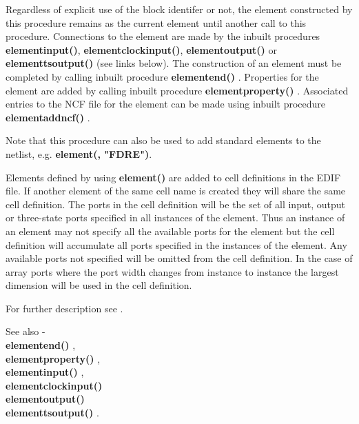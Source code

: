         Regardless of explicit use of the block identifer or not, the element
        constructed by this procedure remains as the current element until
        another call to this procedure. Connections to the element are made by
        the inbuilt procedures {\bf elementinput()}, {\bf elementclockinput()},
        {\bf elementoutput()} or {\bf elementtsoutput()} (see links below). The
        construction of an element must be completed by calling inbuilt
        procedure {\bf elementend()} . Properties
        for the element are added by calling inbuilt procedure {\bf
        elementproperty()} . Associated entries
        to the NCF file for the element can be made using inbuilt
        procedure {\bf elementaddncf()} .
        
        Note that this procedure can also be used to add standard elements to
        the netlist, e.g. {\bf element(, "FDRE")}.
        
        Elements defined by using {\bf element()} are added to cell definitions in
        the EDIF file. If another element of the same cell name is created they
        will share the same cell definition. The ports in the cell definition will
        be the set of all input, output or three-state ports specified in all
        instances of the element. Thus an instance of an element may not specify
        all the available ports for the element but the cell definition will
        accumulate all ports specified in the instances of the element. Any
        available ports not specified will be omitted from the cell definition.
        In the case of array ports where the port width
        changes from instance to instance the largest dimension will be used in
        the cell definition.
        
        For further description see .

        See also - \\
        {\bf elementend()} , \\
        {\bf elementproperty()} , \\
        {\bf elementinput()} , \\
        {\bf elementclockinput()}  \\
        {\bf elementoutput()}  \\
        {\bf elementtsoutput()} .





